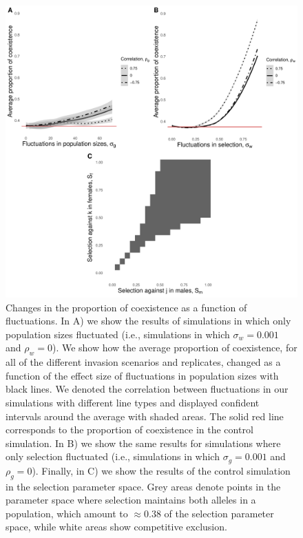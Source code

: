 \documentclass[12pt]{article}
\begin{document}
\clearpage
\begin{figure}[t]
  \centerline{\includegraphics[width=1\textwidth]{proportions.pdf}}
  \caption{ Changes in the proportion of coexistence as a function of fluctuations. In A) we show the results of  simulations in which only population sizes fluctuated (i.e., simulations in which $\sigma_{w}=0.001$ and $\rho_{w}= 0$). We show how the average proportion of coexistence, for all of the different invasion scenarios and replicates, changed as a function of the effect size of fluctuations in population sizes with black lines. We denoted the correlation between fluctuations in our simulations with different line types and displayed confident intervals around the average with shaded areas. The solid red line corresponds to the proportion of coexistence in the control simulation.  In B) we show the same results for simulations where only selection fluctuated  (i.e., simulations in which $\sigma_{g}=0.001$ and $\rho_{g}= 0$). Finally, in C) we show the results of the control simulation in the selection parameter space. Grey areas denote points in the parameter space where selection maintains both alleles in a population, which amount to $\approx 0.38$ of the selection parameter space, while white areas show competitive exclusion.}
    \label{fig:prop}
\end{figure}
\end{document}
